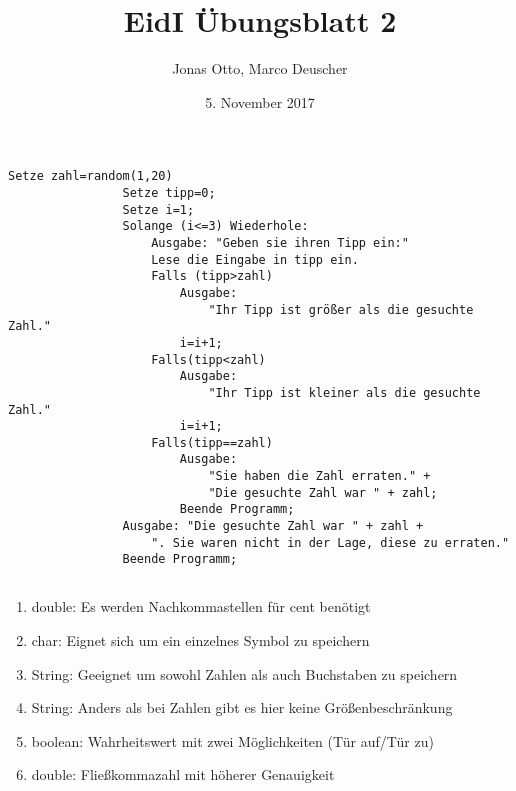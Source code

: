 \documentclass{article}
\newcommand{\blattNr}{2}
\begin{document}
    \title{EidI Übungsblatt \blattNr}
    \author{Jonas Otto, Marco Deuscher}
    \date{5. November 2017}
    \maketitle

    \section*{}
        \subsection{}
            \begin{lstlisting}[autogobble]
                Setze zahl=random(1,20)
                Setze tipp=0;
                Setze i=1;
                Solange (i<=3) Wiederhole:
                    Ausgabe: "Geben sie ihren Tipp ein:"
                    Lese die Eingabe in tipp ein.
                    Falls (tipp>zahl)
                        Ausgabe:
                            "Ihr Tipp ist größer als die gesuchte Zahl."
                        i=i+1;
                    Falls(tipp<zahl)
                        Ausgabe:
                            "Ihr Tipp ist kleiner als die gesuchte Zahl."
                        i=i+1;
                    Falls(tipp==zahl)
                        Ausgabe:
                            "Sie haben die Zahl erraten." +
                            "Die gesuchte Zahl war " + zahl;
                        Beende Programm;
                Ausgabe: "Die gesuchte Zahl war " + zahl +
                    ". Sie waren nicht in der Lage, diese zu erraten."
                Beende Programm;
            \end{lstlisting}

        \subsection{}
            \begin{enumerate}[label=(\roman*)]
                \item double: Es werden Nachkommastellen für cent benötigt
                \item char: Eignet sich um ein einzelnes Symbol zu speichern
                \item String: Geeignet um sowohl Zahlen als auch Buchstaben zu
                    speichern
                \item String: Anders als bei Zahlen gibt es hier keine
                    Größenbeschränkung
                \item boolean: Wahrheitswert mit zwei Möglichkeiten (Tür auf/Tür
                    zu)
                \item double: Fließkommazahl mit höherer Genauigkeit
            \end{enumerate}
\end{document}
